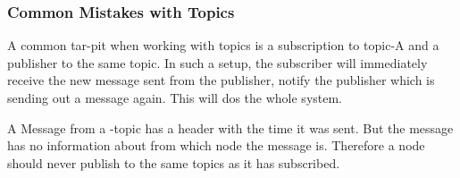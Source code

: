 \subsubsection[Mistakes]{Common Mistakes with Topics} \label{sec:ros-common-mistakes}

A common tar-pit when working with topics is a subscription to \gls{topic}-A and a publisher to the same \gls{topic}.
In such a setup, the subscriber will immediately receive the new message sent from the publisher, notify the publisher which is sending out a message again.
This will \gls{dos} the whole system.

A Message from a -\Gls{topic} has a header with the time it was sent.
But the message has no information about from which \Gls{node} the message is.
Therefore a node should never publish to the same topics as it has subscribed.



